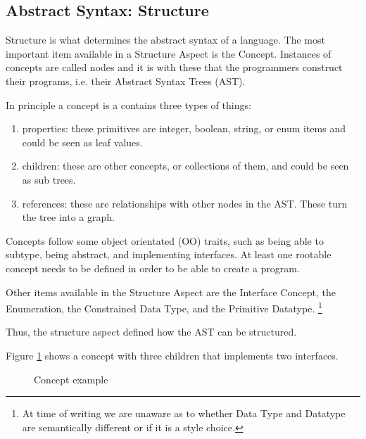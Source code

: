 \subsection{Abstract Syntax: Structure}
Structure is what determines the abstract syntax of a language.
The most important item available in a Structure Aspect is the Concept.
Instances of concepts are called nodes and it is with these that the programmers construct their programs, i.e. their Abstract Syntax Trees (AST).

In principle a concept is a contains three types of things:
\begin{enumerate}
    \item properties: these primitives are integer, boolean, string, or enum items and could be seen as leaf values.
    \item children: these are other concepts, or collections of them, and could be seen as sub trees.
    \item references: these are relationships with other nodes in the AST. These turn the tree into a graph.
\end{enumerate}

Concepts follow some object orientated (OO) traits, such as being able to subtype, being abstract, and implementing interfaces.
At least one rootable concept needs to be defined in order to be able to create a program.

Other items available in the Structure Aspect are the Interface Concept, the Enumeration, the Constrained Data Type, and the Primitive Datatype.
\footnote{At time of writing we are unaware as to whether Data Type and Datatype are semantically different or if it is a style choice.}

Thus, the structure aspect defined how the AST can be structured.

Figure \ref{fig:concept_example} shows a concept with three children that implements two interfaces.

\begin{figure}[h]
    \centering
    \caption{Concept example}
    \label{fig:concept_example}
\end{figure}
 

